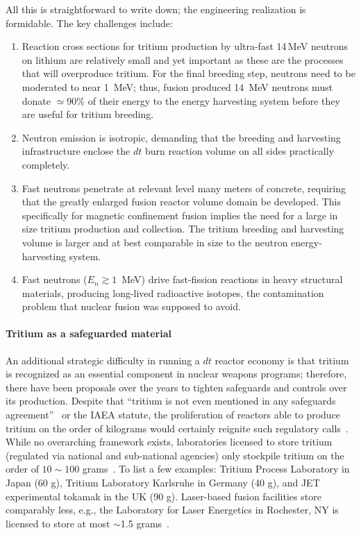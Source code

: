 \documentclass[particles,article,accept,pdftex,moreauthors]{Definitions/mdpi}
\begin{document}
All this is straightforward to write down; the engineering realization is formidable. The key challenges include:
\begin{enumerate}
\item Reaction cross sections for tritium production by ultra-fast 14\,MeV neutrons on lithium are relatively small and yet important as these are the processes that will overproduce tritium. For the final breeding step, neutrons need to be moderated to near 1~MeV; thus, fusion produced 14~MeV neutrons must donate $\simeq$90\% of their energy to the energy harvesting system before they are useful for tritium breeding.
\item Neutron emission is isotropic, demanding that the breeding and harvesting infrastructure enclose the $dt$ burn reaction volume on all sides practically completely.
\item Fast neutrons penetrate at relevant level many meters of concrete, requiring that the greatly enlarged fusion reactor volume domain be developed. This specifically for magnetic confinement fusion implies the need for a large in size tritium production and collection. The tritium breeding and harvesting volume is larger and at best comparable in size to the neutron energy-harvesting system.
\item Fast neutrons ($E_n \gtrsim 1$~MeV) drive fast-fission reactions in heavy structural materials, producing long-lived radioactive isotopes, the contamination problem that nuclear fusion was supposed to avoid.
\end{enumerate}

\paragraph*{\bf Tritium as a safeguarded material}
An additional strategic difficulty in running a $dt$ reactor economy is that tritium is recognized as an essential component in nuclear weapons programs; therefore, there have been proposals over the years to tighten safeguards and controls over its production. Despite that ``tritium is not even mentioned in any safeguards agreement''~\cite{von1990modern} or the IAEA statute, the proliferation of reactors able to produce tritium on the order of kilograms would certainly reignite such regulatory calls~\cite{dalton2017toward,abdou2021physics}. While no overarching framework exists, laboratories licensed to store tritium (regulated via national and sub-national agencies) only stockpile tritium on the order of $10\sim100$ grams~\cite{iaea2024}. To list a few examples: Tritium Process Laboratory in Japan (60 g), Tritium Laboratory Karlsruhe in Germany (40 g), and JET experimental tokamak in the UK (90 g). Laser-based fusion facilities store comparably less, e.g., the Laboratory for Laser Energetics in Rochester, NY is licensed to store at most $\sim$1.5 grams~\cite{lle_cryogenic_tritium}.
\end{document}
